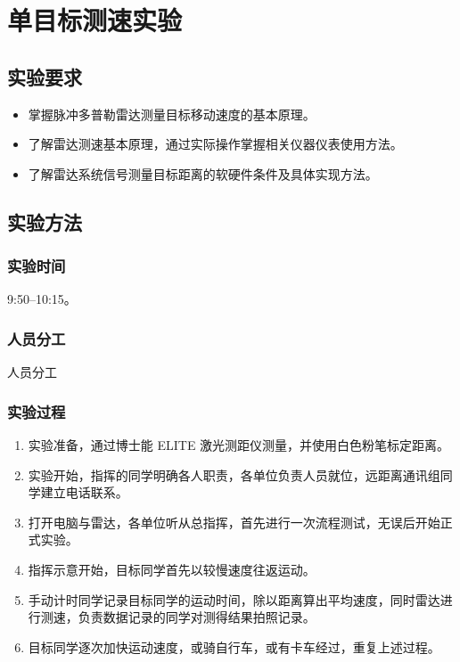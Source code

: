 \documentclass[../main]{subfiles}
\begin{document}
\chapter{单目标测速实验}%
\label{cha:velocity}

\section{实验要求}%
\label{sec:requirement}

\begin{itemize}
  \item 掌握脉冲多普勒雷达测量目标移动速度的基本原理。
  \item 了解雷达测速基本原理，通过实际操作掌握相关仪器仪表使用方法。
  \item 了解雷达系统信号测量目标距离的软硬件条件及具体实现方法。
\end{itemize}

\section{实验方法}%
\label{sec:\arabic{chapter}method}

\subsection{实验时间}%
\label{sub:\arabic{chapter}time}

9:50--10:15。

\subsection{人员分工}%
\label{sub:\arabic{chapter}people}

\begin{table}[htbp]
  \centering
  \caption{人员分工}%
  \label{tab:\arabic{chapter}people}
  \tiny
\end{table}

\subsection{实验过程}%
\label{sub:\arabic{chapter}process}

\begin{enumerate}
  \item 实验准备，通过博士能 ELITE 激光测距仪测量，并使用白色粉笔标定距离。
  \item 实验开始，指挥的同学明确各人职责，各单位负责人员就位，远距离通讯组同
    学建立电话联系。
  \item 打开电脑与雷达，各单位听从总指挥，首先进行一次流程测试，无误后开始正
    式实验。
  \item 指挥示意开始，目标同学首先以较慢速度往返运动。
  \item 手动计时同学记录目标同学的运动时间，除以距离算出平均速度，同时雷达进
    行测速，负责数据记录的同学对测得结果拍照记录。
  \item 目标同学逐次加快运动速度，或骑自行车，或有卡车经过，重复上述过程。
\end{enumerate}
\end{document}
